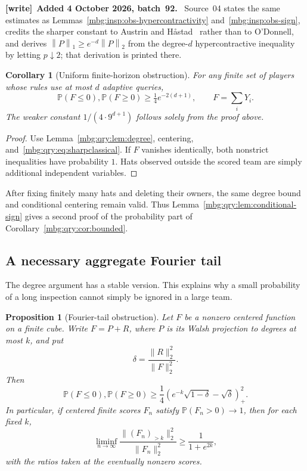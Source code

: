 \documentclass[11pt,letterpaper]{article}
\newtheorem{proposition}[theorem]{Proposition}
\newtheorem{corollary}[theorem]{Corollary}
\theoremstyle{definition}
\newcommand{\Prb}{\mathbb P}
\newcommand{\norm}[1]{\left\lVert #1\right\rVert}
\newenvironment{writenote}[1][]{\par\smallskip\begingroup\small
 \noindent\textbf{[write]}\if\relax\detokenize{#1}\relax\else~\textbf{#1.}\fi\ }%
 {\par\endgroup\smallskip}
\begin{document}
\begin{writenote}[Added 4 October 2026, batch~92]
Source~04 states the same estimates as Lemmas~\ref{mbg:insp:obs-hypercontractivity} and~\ref{mbg:insp:obs-sign}, credits the sharper constant to Austrin and H\aa stad~\cite{insp:AustrinHastadSTOC} rather than to O'Donnell, and derives $\norm{P}_1\ge e^{-d}\norm{P}_2$ from the degree-$d$ hypercontractive inequality by letting $p\downarrow2$; that derivation is printed there.
\end{writenote}

\begin{corollary}[Uniform finite-horizon obstruction]
\label{mbg:qry:cor:finite-analytic}
For any finite set of players whose rules use at most \(d\) adaptive
queries,
\[
 \Prb(F\le0),\Prb(F\ge0)\ge\tfrac14e^{-2(d+1)},
 \qquad F=\sum_iY_i.
\]
The weaker constant \(1/(4\cdot9^{d+1})\) follows solely from the
proof above.
\end{corollary}

\begin{proof}
Use Lemma~\ref{mbg:qry:lem:degree}, centering, and~\eqref{mbg:qry:eq:sharpclassical}.
If \(F\) vanishes identically, both nonstrict inequalities have
probability \(1\). Hats observed outside the scored team are simply
additional independent variables.
\end{proof}

After fixing finitely many hats and deleting their owners, the same
degree bound and conditional centering remain valid. Thus
Lemma~\ref{mbg:qry:lem:conditional-sign} gives a second proof of the probability
part of Corollary~\ref{mbg:qry:cor:bounded}.

\subsection{A necessary aggregate Fourier tail}

The degree argument has a stable version. This explains why a small
probability of a long inspection cannot simply be ignored in a
large team.

\begin{proposition}[Fourier-tail obstruction]
\label{mbg:qry:prop:spectral}
Let \(F\) be a nonzero centered function on a finite cube. Write
\(F=P+R\), where \(P\) is its Walsh projection to degrees at most \(k\),
and put
\[
 \delta=\frac{\|R\|_2^2}{\|F\|_2^2}.
\]
Then
\begin{equation}
 \Prb(F\le0),\Prb(F\ge0)\ge
 \frac14\left(e^{-k}\sqrt{1-\delta}-\sqrt{\delta}\right)_+^2.
 \label{mbg:qry:eq:spectral}
\end{equation}
In particular, if centered finite scores \(F_n\) satisfy
\(\Prb(F_n>0)\to1\), then for each fixed \(k\),
\[
 \liminf_{n\to\infty}
 \frac{\|(F_n)_{>k}\|_2^2}{\|F_n\|_2^2}
 \ge\frac{1}{1+e^{2k}},
\]
with the ratios taken at the eventually nonzero scores.
\end{proposition}
\end{document}
